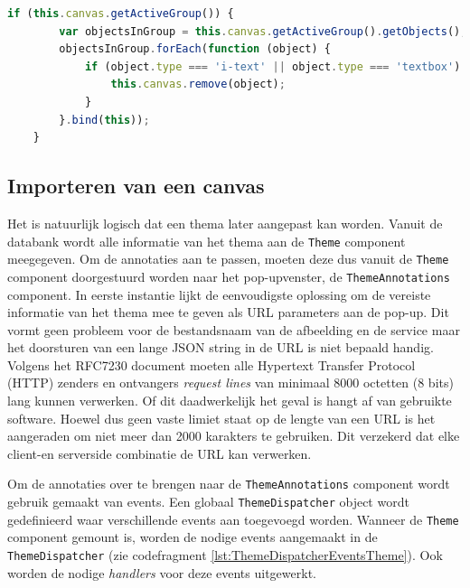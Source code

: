 \begin{lstlisting}[caption={ThemeAnnotations component - Verwijderen van een groep},label=lst:ThemeAnnotationsDeleteGroup,language=javascript]
	if (this.canvas.getActiveGroup()) {
		var objectsInGroup = this.canvas.getActiveGroup().getObjects();
		objectsInGroup.forEach(function (object) {
			if (object.type === 'i-text' || object.type === 'textbox') {
				this.canvas.remove(object);
			}
		}.bind(this));
	}
\end{lstlisting}

\subsection{Importeren van een canvas}
Het is natuurlijk logisch dat een thema later aangepast kan worden. Vanuit de databank wordt alle informatie van het thema aan de \texttt{Theme} component meegegeven. Om de annotaties aan te passen, moeten deze dus vanuit de \texttt{Theme} component doorgestuurd worden naar het pop-upvenster, de \texttt{ThemeAnnotations} component. In eerste instantie lijkt de eenvoudigste oplossing om de vereiste informatie van het thema mee te geven als URL parameters aan de pop-up. Dit vormt geen probleem voor de bestandsnaam van de afbeelding en de service maar het doorsturen van een lange JSON string in de URL is niet bepaald handig. Volgens het RFC7230 document moeten alle Hypertext Transfer Protocol (HTTP) zenders en ontvangers \textit{request lines} van minimaal 8000 octetten (8 bits) lang kunnen verwerken\cite{RFC7230}. Of dit daadwerkelijk het geval is hangt af van gebruikte software. %
Hoewel dus geen vaste limiet staat op de lengte van een URL is het aangeraden om niet meer dan 2000 karakters te gebruiken. Dit verzekerd dat elke client-en serverside combinatie de URL kan verwerken.  %

Om de annotaties over te brengen naar de \texttt{ThemeAnnotations} component wordt gebruik gemaakt van events. Een globaal \texttt{ThemeDispatcher} object wordt gedefinieerd waar verschillende events aan toegevoegd worden. Wanneer de \texttt{Theme} component gemount is, worden de nodige events aangemaakt in de \texttt{ThemeDispatcher} (zie codefragment \ref{lst:ThemeDispatcherEventsTheme}). Ook worden de nodige \textit{handlers} voor deze events uitgewerkt.

